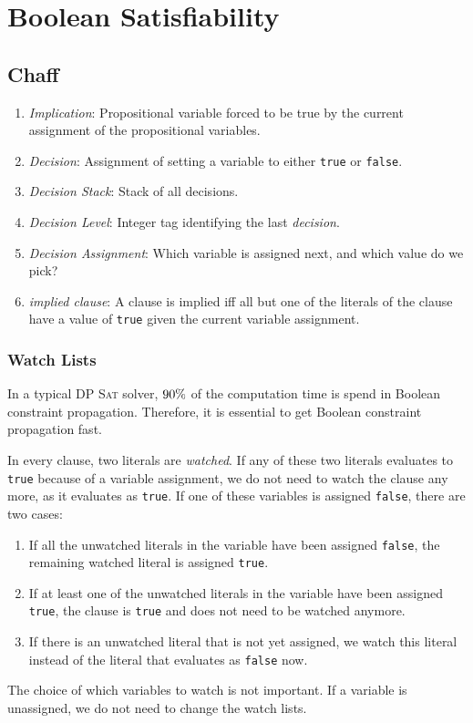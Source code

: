 \chapter{Boolean Satisfiability}

\section{Chaff}

\begin{enumerate}
\item \emph{Implication}: Propositional variable forced to be true by the current assignment of the
      propositional variables.
\item \emph{Decision}: Assignment of setting a variable to either \texttt{true} or \texttt{false}.
\item \emph{Decision Stack}: Stack of all decisions.
\item \emph{Decision Level}: Integer tag identifying the last \emph{decision}.
\item \emph{Decision Assignment}: Which variable is assigned next, and which value do we pick?
\item \emph{implied clause}: A clause is implied iff all but one of the literals of the clause have
      a value of \texttt{true} given the current variable assignment.
\end{enumerate}

\subsection{Watch Lists}
In a typical DP \textsc{Sat} solver, $90\symbol{37}$ of the computation time is spend in Boolean
constraint propagation.  Therefore, it is essential to get Boolean constraint propagation fast.
 
In every clause, two literals are \emph{watched}.  If any of these two literals evaluates to \texttt{true}
because of a variable assignment, we do not need to watch the clause any more, as it evaluates as 
\texttt{true}.  If one of these variables is assigned \texttt{false}, there are two cases:
\begin{enumerate}
\item If all the unwatched literals in the variable have been assigned 
      \texttt{false}, the remaining watched literal is assigned \texttt{true}.
\item If at least one of the unwatched literals in the variable have been assigned 
      \texttt{true}, the clause is \texttt{true} and does not need to be watched anymore.
\item If there is an unwatched literal that is not yet assigned, we watch this literal instead of
      the literal that evaluates as \texttt{false} now.
\end{enumerate}
The choice of which variables to watch is not important.  If a variable is unassigned, we do not
need to change the watch lists.

